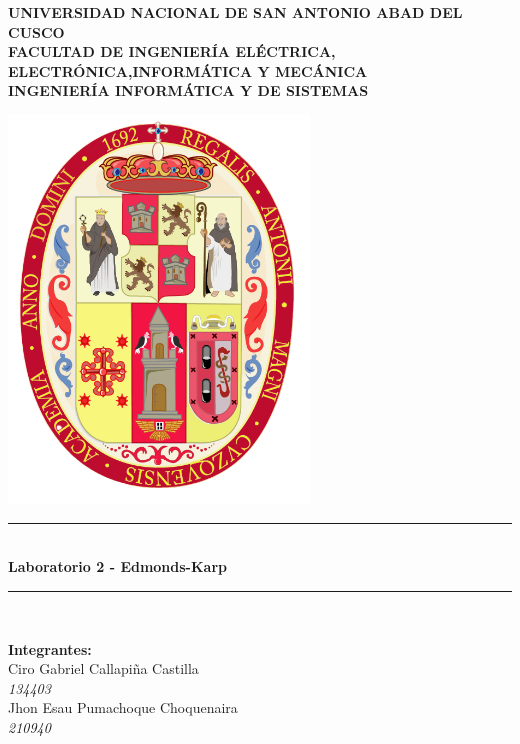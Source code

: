 \documentclass[a4paper]{article}
\begin{document}
\begin{titlepage}

\newcommand{\linea}{\rule{\linewidth}{0.7mm}} 
\center
\textbf{\Large UNIVERSIDAD NACIONAL DE SAN ANTONIO ABAD DEL CUSCO}\\[0.2cm]
\textbf{\Large FACULTAD DE INGENIERÍA ELÉCTRICA, ELECTRÓNICA,INFORMÁTICA Y MECÁNICA}\\[0.2cm]
\textbf{\Large INGENIERÍA INFORMÁTICA Y DE SISTEMAS\\[0.6cm]}

\includegraphics[width=8cm]{escudo-unsaac.png}
\vfill

\linea
\\[0.3cm]
\textbf{\LARGE Laboratorio 2 - Edmonds-Karp}\\[0.2cm]
\linea \\
\vfill

\textbf{\Large Integrantes:}\\[0.2cm]
    {\large Ciro Gabriel Callapiña Castilla}\\
    \textit{134403}\\[0.1cm]

    {\large Jhon Esau Pumachoque Choquenaira }\\
    \textit{210940}\\[0.1cm]


\end{titlepage}
\end{document}

